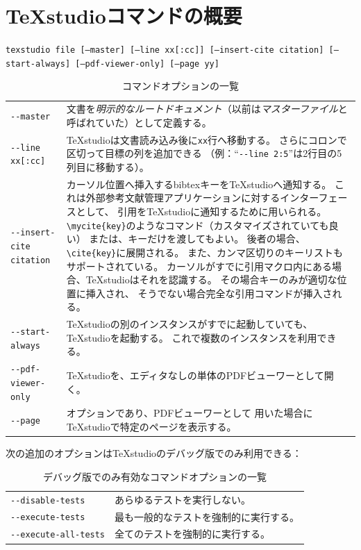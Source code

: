 \section{TeXstudioコマンドの概要}

\texttt{texstudio file {[}--master{]} {[}--line xx{[}:cc{]}{]} {[}--insert-cite citation{]} {[}--start-always{]} {[}--pdf-viewer-only{]} {[}--page yy{]}}

\begin{table}[H]
  \centering
  \caption{コマンドオプションの一覧}
  \begin{tabularx}{\linewidth}{lX}
    \hline
    \verb+--master+
      & 文書を\emph{明示的なルートドキュメント}（以前は\emph{マスターファイル}と呼ばれていた）として定義する。\\
    \verb+--line xx[:cc]+
      & TeXstudioは文書読み込み後に\texttt{xx}行へ移動する。
      さらにコロンで区切って目標の列を追加できる
      （例：``\verb+--line 2:5+''は2行目の5列目に移動する）。\\
    \verb+--insert-cite citation+
      & カーソル位置へ挿入するbibtexキーをTeXstudioへ通知する。
      これは外部参考文献管理アプリケーションに対するインターフェースとして、
      引用をTeXstudioに通知するために用いられる。
      \verb+\mycite{key}+のようなコマンド（カスタマイズされていても良い）
      または、キーだけを渡してもよい。
      後者の場合、\verb+\cite{key}+に展開される。
      また、カンマ区切りのキーリストもサポートされている。
      カーソルがすでに引用マクロ内にある場合、TeXstudioはそれを認識する。
      その場合キーのみが適切な位置に挿入され、
      そうでない場合完全な引用コマンドが挿入される。\\
    \verb+--start-always+
      & TeXstudioの別のインスタンスがすでに起動していても、TeXstudioを起動する。
      これで複数のインスタンスを利用できる。\\
    \verb+--pdf-viewer-only+
      & TeXstudioを、エディタなしの単体のPDFビューワーとして開く。\\
    \verb+--page+
      & オプションであり、PDFビューワーとして
      用いた場合にTeXstudioで特定のページを表示する。\\
    \hline
  \end{tabularx}
\end{table}

次の追加のオプションはTeXstudioのデバッグ版でのみ利用できる：

\begin{table}[H]
  \centering
  \caption{デバッグ版でのみ有効なコマンドオプションの一覧}
  \begin{tabularx}{\linewidth}{lX}
    \hline
    \verb+--disable-tests+ & あらゆるテストを実行しない。\\
    \verb+--execute-tests+ & 最も一般的なテストを強制的に実行する。\\
    \verb+--execute-all-tests+ & 全てのテストを強制的に実行する。\\
    \hline
  \end{tabularx}
\end{table}

